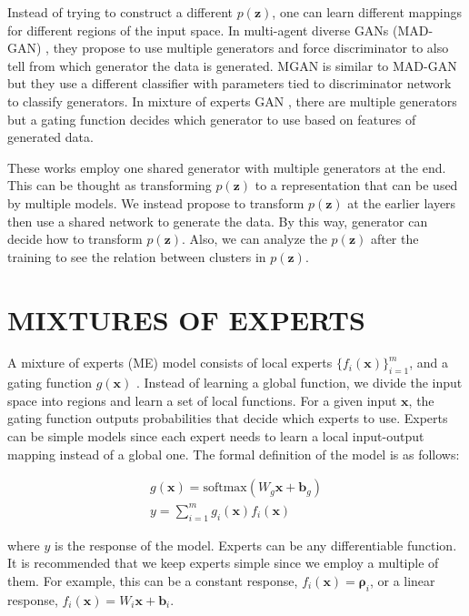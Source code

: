 \documentclass[a4paper,onesided,12pt]{report}
\begin{document}
Instead of trying to construct a different $p(\boldsymbol{z})$, one can learn different mappings for different regions of the input space. In multi-agent diverse GANs (MAD-GAN) \cite{madgan}, they propose to use multiple generators and force discriminator to also tell from which generator the data is generated.  MGAN \cite{mgan} is similar to MAD-GAN but they use a different classifier with parameters tied to discriminator network to classify generators. In mixture of experts GAN \cite{megan}, there are multiple generators but a gating function decides which generator to use based on features of generated data.

These works employ one shared generator with multiple generators at the end. This can be thought as transforming $p(\boldsymbol{z})$ to a representation that can be used by multiple models. We instead propose to transform $p(\boldsymbol{z})$ at the earlier layers then use a shared network to generate the data. By this way, generator can decide how to transform $p(\boldsymbol{z})$. Also, we can analyze the $p(\boldsymbol{z})$ after the training to see the relation between clusters in $p(\boldsymbol{z})$.

\chapter{MIXTURES OF EXPERTS}
\label{chapter:me}

A mixture of experts (ME) model consists of local experts $\{f_i(\boldsymbol{x})\}_{i=1}^{m}$, and a gating function $g(\boldsymbol{x})$ \cite{me}. Instead of learning a global function, we divide the input space into regions and learn a set of local functions. For a given input $\boldsymbol{x}$, the gating function outputs probabilities that decide which experts to use. Experts can be simple models since each expert needs to learn a local input-output mapping instead of a global one. The formal definition of the model is as follows:

\begin{eqnarray}
g(\boldsymbol{x}) = \text{softmax}(W_g \boldsymbol{x} + \boldsymbol{b}_g)\\
y = \sum_{i=1}^m g_i(\boldsymbol{x}) f_i(\boldsymbol{x})
\end{eqnarray}

where $y$ is the response of the model. Experts can be any differentiable function. It is recommended that we keep experts simple since we employ a multiple of them. For example, this can be a constant response, $f_i(\boldsymbol{x})=\boldsymbol{\rho}_i$, or a linear response, $f_i(\boldsymbol{x})=W_i \boldsymbol{x} + \boldsymbol{b}_i$.
\end{document}
